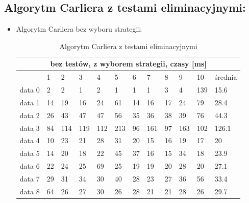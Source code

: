 \documentclass[11pt]{article}
\begin{document}
\subsection{Algorytm Carliera z testami eliminacyjnymi:}
\begin{itemize}
\item Algorytm Carliera bez wyboru strategii:\\
\begin{table}[!ht]
\centering
\label{my-label}
\begin{tabular}{|l|l|l|l|l|l|l|l|l|l|l|l|}
\hline
\multicolumn{12}{|c|}{bez testów, z wyborem strategii, czasy {[}ms{]}}           \\ \hline
       & 1  & 2   & 3   & 4   & 5   & 6  & 7   & 8  & 9   & 10  & średnia \\ \hline
data 0 & 2  & 2   & 1   & 2   & 1   & 1  & 1   & 3  & 4   & 139 & 15.6    \\ \hline
data 1 & 14 & 19  & 16  & 24  & 61  & 14 & 16  & 17 & 24  & 79  & 28.4    \\ \hline
data 2 & 26 & 43  & 47  & 47  & 56  & 35 & 36  & 38 & 39  & 76  & 44.3    \\ \hline
data 3 & 84 & 114 & 119 & 112 & 213 & 96 & 161 & 97 & 163 & 102 & 126.1   \\ \hline
data 4 & 10 & 23  & 21  & 28  & 31  & 20 & 15  & 16 & 19  & 17  & 20      \\ \hline
data 5 & 14 & 20  & 18  & 22  & 45  & 37 & 16  & 15 & 34  & 18  & 23.9    \\ \hline
data 6 & 22 & 24  & 25  & 69  & 25  & 19 & 19  & 20 & 28  & 20  & 27.1    \\ \hline
data 7 & 29 & 31  & 34  & 30  & 40  & 28 & 23  & 27 & 36  & 56  & 33.4    \\ \hline
data 8 & 64 & 26  & 27  & 30  & 26  & 28 & 21  & 21 & 28  & 26  & 29.7    \\ \hline
\end{tabular}
\caption{Algorytm Carliera z testami eliminacyjnymi}
\end{table}


\end{itemize}
\end{document}
